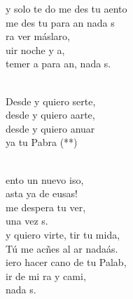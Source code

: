 \begin{cancion}%
	y solo te do  me des tu aento\\
	 me des tu  para an nada s \\
	ra ver máslaro,\\
	uir noche y a, \\
	temer a  para an, nada s. \\\jump\\
	\begin{chorus}%
	Desde y quiero serte,\\
	desde y quiero aarte,\\
	desde y quiero anuar\\
	ya tu Pabra (**)\\
	\end{chorus}%
	\jump\\
	ento un nuevo iso,\\
	asta ya de eusas!\\
	me despera tu ver,\\
	una vez s. \\
	y quiero virte, tir tu mida,\\
	 Tú me acñes al ar nadaás.\\
	iero hacer cano de tu Palab,\\
	ir de mi ra y cami,\\
	nada s. \\
\end{cancion}%
